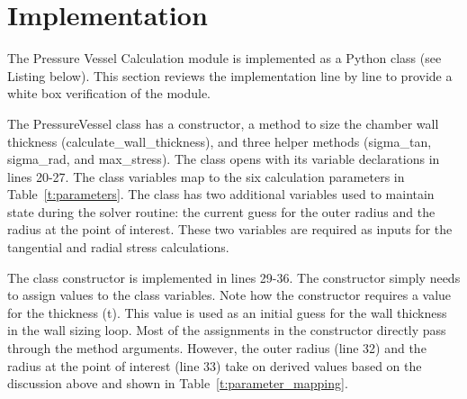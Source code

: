 \documentclass{article}
\begin{document}
\section{Implementation}
The Pressure Vessel Calculation module is implemented as a Python class (see Listing below).  This section reviews the implementation line by line to provide a white box verification of the module.  

The PressureVessel class has a constructor, a method to size the chamber wall thickness (calculate\_wall\_thickness), and three helper methods (sigma\_tan, sigma\_rad, and max\_stress).  The class opens with its variable declarations in lines 20-27.  The class variables map to the six calculation parameters in Table~\ref{t:parameters}.  The class has two additional variables used to maintain state during the solver routine: the current guess for the outer radius and the radius at the point of interest.  These two variables are required as inputs for the tangential and radial stress calculations.  

The class constructor is implemented in lines 29-36.  The constructor simply needs to assign values to the class variables.  Note how the constructor requires a value for the thickness (t).  This value is used as an initial guess for the wall thickness in the wall sizing loop.  Most of the assignments in the constructor directly pass through the method arguments.  However, the outer radius (line 32) and the radius at the point of interest (line 33) take on derived values based on the discussion above and shown in Table~\ref{t:parameter_mapping}.

\inputminted[breaklines,linenos,frame=lines,framesep=2.0\fboxsep]{python}{pressure_vessel_calcs.py}
\end{document}
